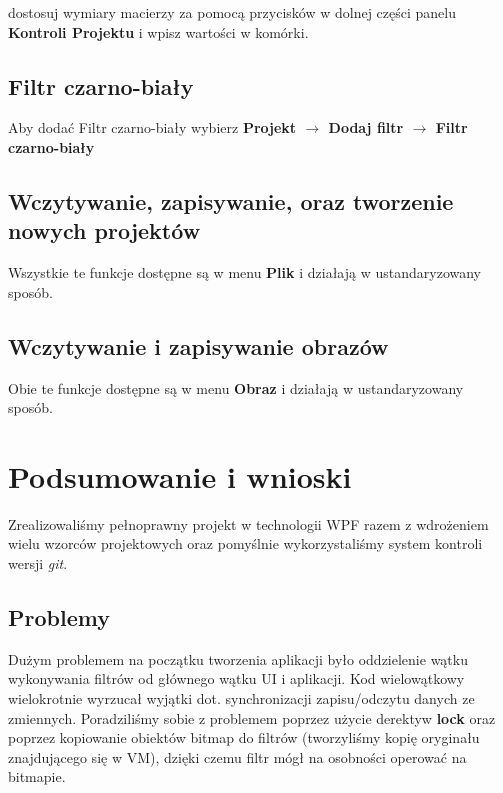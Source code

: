 \documentclass{article}
\begin{document}
dostosuj wymiary macierzy za pomocą przycisków w dolnej części panelu \textbf{Kontroli Projektu} i wpisz wartości w komórki.

\subsection{Filtr czarno-biały}
Aby dodać Filtr czarno-biały wybierz \textbf{Projekt $\rightarrow$ Dodaj filtr $\rightarrow$ Filtr czarno-biały}

\subsection{Wczytywanie, zapisywanie, oraz tworzenie nowych projektów}
Wszystkie te funkcje dostępne są w menu \textbf{Plik} i działają w ustandaryzowany sposób.

\subsection{Wczytywanie i zapisywanie obrazów}
Obie te funkcje dostępne są w menu \textbf{Obraz} i działają w ustandaryzowany sposób.


\section{Podsumowanie i wnioski}
Zrealizowaliśmy pełnoprawny projekt w technologii WPF razem z wdrożeniem wielu wzorców projektowych oraz pomyślnie
wykorzystaliśmy system kontroli wersji \textit{git}.
\subsection{Problemy}
Dużym problemem na początku tworzenia aplikacji było oddzielenie wątku wykonywania filtrów od głównego wątku UI i aplikacji.
Kod wielowątkowy wielokrotnie wyrzucał wyjątki dot. synchronizacji zapisu/odczytu danych ze zmiennych.
Poradziliśmy sobie z problemem poprzez użycie derektyw \textbf{lock} oraz poprzez kopiowanie obiektów bitmap do filtrów 
(tworzyliśmy kopię oryginału znajdującego się w VM), dzięki czemu filtr mógł na osobności operować na bitmapie.
\end{document}
